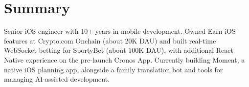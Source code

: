 \section{Summary}
Senior iOS engineer with 10+ years in mobile development. Owned Earn iOS features at Crypto.com Onchain (about 20K DAU) and built real-time WebSocket betting for SportyBet (about 100K DAU), with additional React Native experience on the pre-launch Cronos App. Currently building Moment, a native iOS planning app, alongside a family translation bot and tools for managing AI-assisted development.

